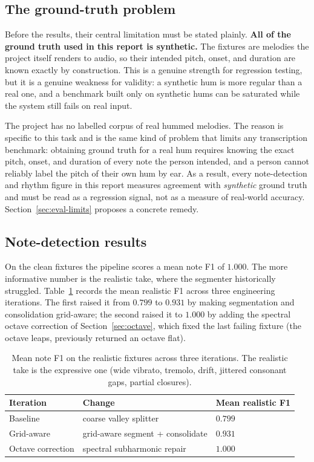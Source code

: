 \documentclass[12pt,a4paper]{article}
\begin{document}
\subsection{The ground-truth problem}
\label{sec:groundtruth}

Before the results, their central limitation must be stated plainly. \textbf{All
of the ground truth used in this report is synthetic.} The fixtures are
melodies the project itself renders to audio, so their intended pitch, onset,
and duration are known exactly by construction. This is a genuine strength for
regression testing, but it is a genuine weakness for validity: a synthetic hum
is more regular than a real one, and a benchmark built only on synthetic hums
can be saturated while the system still fails on real input.

The project has no labelled corpus of real hummed melodies. The reason is
specific to this task and is the same kind of problem that limits any
transcription benchmark: obtaining ground truth for a real hum requires knowing
the exact pitch, onset, and duration of every note the person intended, and a
person cannot reliably label the pitch of their own hum by ear. As a result,
every note-detection and rhythm figure in this report measures agreement with
\emph{synthetic} ground truth and must be read as a regression signal, not as a
measure of real-world accuracy. Section~\ref{sec:eval-limits} proposes a
concrete remedy.

\subsection{Note-detection results}
\label{sec:results-note}

On the clean fixtures the pipeline scores a mean note F1 of $1.000$. The more
informative number is the realistic take, where the segmenter historically
struggled. Table~\ref{tab:note-progression} records the mean realistic F1
across three engineering iterations. The first raised it from $0.799$ to
$0.931$ by making segmentation and consolidation grid-aware; the second raised
it to $1.000$ by adding the spectral octave correction of
Section~\ref{sec:octave}, which fixed the last failing fixture (the octave
leaps, previously returned an octave flat).

\begin{table}[H]
\centering
\caption{Mean note F1 on the realistic fixtures across three iterations. The
realistic take is the expressive one (wide vibrato, tremolo, drift, jittered
consonant gaps, partial closures).}
\label{tab:note-progression}
\begin{tabular}{l l l}
\toprule
\textbf{Iteration} & \textbf{Change} & \textbf{Mean realistic F1} \\
\midrule
Baseline              & coarse valley splitter                 & $0.799$ \\
Grid-aware            & grid-aware segment + consolidate        & $0.931$ \\
Octave correction     & spectral subharmonic repair             & $1.000$ \\
\bottomrule
\end{tabular}
\end{table}
\end{document}
